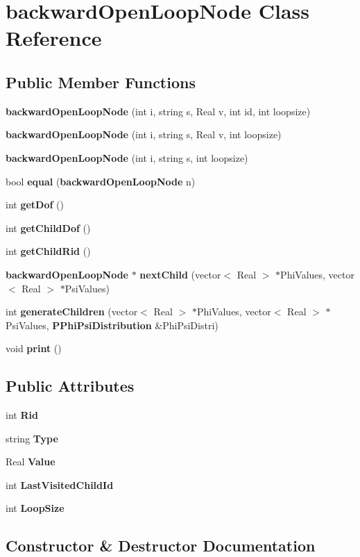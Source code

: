 \section{backward\-Open\-Loop\-Node Class Reference}
\label{classbackwardOpenLoopNode}
\subsection*{Public Member Functions}
\begin{CompactItemize}
\item 
{\bf backward\-Open\-Loop\-Node} (int i, string s, Real v, int id, int loopsize)
\item 
{\bf backward\-Open\-Loop\-Node} (int i, string s, Real v, int loopsize)
\item 
{\bf backward\-Open\-Loop\-Node} (int i, string s, int loopsize)
\item 
bool {\bf equal} ({\bf backward\-Open\-Loop\-Node} n)
\item 
int {\bf get\-Dof} ()
\item 
int {\bf get\-Child\-Dof} ()
\item 
int {\bf get\-Child\-Rid} ()
\item 
{\bf backward\-Open\-Loop\-Node} $\ast$ {\bf next\-Child} (vector$<$ Real $>$ $\ast$Phi\-Values, vector$<$ Real $>$ $\ast$Psi\-Values)
\item 
int {\bf generate\-Children} (vector$<$ Real $>$ $\ast$Phi\-Values, vector$<$ Real $>$ $\ast$Psi\-Values, {\bf PPhi\-Psi\-Distribution} \&Phi\-Psi\-Distri)
\item 
void {\bf print} ()
\end{CompactItemize}
\subsection*{Public Attributes}
\begin{CompactItemize}
\item 
int {\bf Rid}
\item 
string {\bf Type}
\item 
Real {\bf Value}
\item 
int {\bf Last\-Visited\-Child\-Id}
\item 
int {\bf Loop\-Size}
\end{CompactItemize}


\subsection{Constructor \& Destructor Documentation}
